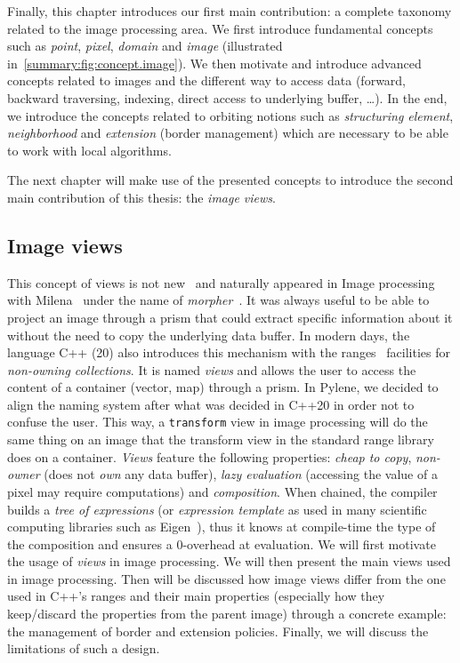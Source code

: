 Finally, this chapter introduces our first main contribution: a complete taxonomy related to the image processing area.
We first introduce fundamental concepts such as \emph{point}, \emph{pixel}, \emph{domain} and \emph{image} (illustrated
in~\cref{summary:fig:concept.image}). We then motivate and introduce advanced concepts related to images and the
different way to access data (forward, backward traversing, indexing, direct access to underlying buffer, \ldots). In
the end, we introduce the concepts related to orbiting notions such as \emph{structuring element}, \emph{neighborhood}
and \emph{extension} (border management) which are necessary to be able to work with local algorithms.

The next chapter will make use of the presented concepts to introduce the second main contribution of this thesis: the
\emph{image views}.


\subsection*{Image views}


This concept of views is not new~\parencite{novak.1997.reuse} and naturally appeared in Image processing with
Milena~\parencite{geraud.2012.ipolmeeting,levillain.2010.icip} under the name of
\emph{morpher}~\parencite{levillain.2009.ismm, geraud.2012.hdr}. It was always useful to be able to project an image
through a prism that could extract specific information about it without the need to copy the underlying data buffer. In
modern days, the language C++ (20) also introduces this mechanism with the ranges~\parencite{niebler.2014.ranges}
facilities for \emph{non-owning collections}. It is named \emph{views} and allows the user to access the content of a
container (vector, map) through a prism. In Pylene, we decided to align the naming system after what was decided in
C++20 in order not to confuse the user. This way, a \texttt{transform} view in image processing will do the same thing
on an image that the transform view in the standard range library does on a container. \emph{Views} feature the
following properties: \emph{cheap to copy}, \emph{non-owner} (does not \emph{own} any data buffer), \emph{lazy
  evaluation} (accessing the value of a pixel may require computations) and \emph{composition}. When chained, the compiler
builds a \emph{tree of expressions} (or \emph{expression template} as used in many scientific computing libraries such
as Eigen~\parencite{guennebaud.2010.eigen}), thus it knows at compile-time the type of the composition and ensures a
0-overhead at evaluation. We will first motivate the usage of \emph{views} in image processing. We will then present the
main views used in image processing. Then will be discussed how image views differ from the one used in C++'s ranges and
their main properties (especially how they keep/discard the properties from the parent image) through a concrete
example: the management of border and extension policies. Finally, we will discuss the limitations of such a design.


